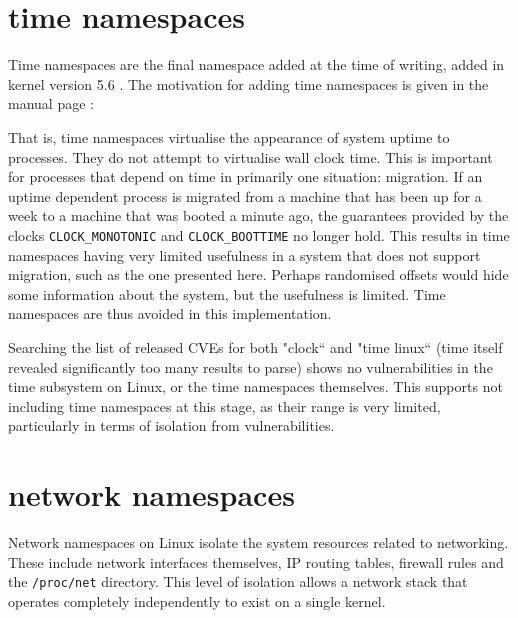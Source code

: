 \documentclass[12pt,a4paper,twoside]{report}
\begin{document}

\section{time namespaces}
\label{sec:voiding-time}

Time namespaces are the final namespace added at the time of writing, added in kernel version 5.6 \citep{linux_kernel_newbies_editors_linux_2020}. The motivation for adding time namespaces is given in the manual page \citep{free_software_foundation_time_namespaces7_2021}:


That is, time namespaces virtualise the appearance of system uptime to processes. They do not attempt to virtualise wall clock time. This is important for processes that depend on time in primarily one situation: migration. If an uptime dependent process is migrated from a machine that has been up for a week to a machine that was booted a minute ago, the guarantees provided by the clocks \texttt{CLOCK\_MONOTONIC} and \texttt{CLOCK\_BOOTTIME} no longer hold. This results in time namespaces having very limited usefulness in a system that does not support migration, such as the one presented here. Perhaps randomised offsets would hide some information about the system, but the usefulness is limited. Time namespaces are thus avoided in this implementation.

Searching the list of released CVEs for both "clock`` and "time linux`` (time itself revealed significantly too many results to parse) shows no vulnerabilities in the time subsystem on Linux, or the time namespaces themselves. This supports not including time namespaces at this stage, as their range is very limited, particularly in terms of isolation from vulnerabilities.

\section{network namespaces}
\label{sec:voiding-net}

Network namespaces on Linux isolate the system resources related to networking. These include network interfaces themselves, IP routing tables, firewall rules and the \texttt{/proc/net} directory. This level of isolation allows a network stack that operates completely independently to exist on a single kernel.
\end{document}
